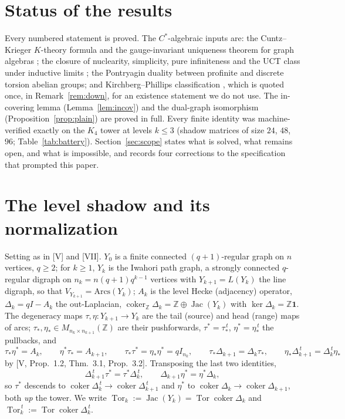 \documentclass[11pt]{amsart}
\numberwithin{equation}{section}
\theoremstyle{definition}
\theoremstyle{remark}
\newcommand{\Z}{\mathbb{Z}}
\newcommand{\Jac}{\operatorname{Jac}}
\newcommand{\coker}{\operatorname{coker}}
\newcommand{\Tor}{\operatorname{Tor}}
\newcommand{\ta}{\tau_*}
\newcommand{\taup}{\tau^*}
\newcommand{\et}{\eta_*}
\newcommand{\etp}{\eta^*}
\begin{document}
\maketitle

\section*{Status of the results}

Every numbered statement is proved. The $C^*$-algebraic inputs are: the
Cuntz--Krieger $K$-theory formula and the gauge-invariant uniqueness theorem for graph
algebras \cite{R}; the closure of nuclearity, simplicity, pure infiniteness and the UCT
class under inductive limits \cite{KR,Ro,RS}; the Pontryagin duality between profinite
and discrete torsion abelian groups; and Kirchberg--Phillips classification \cite{Ph},
which is quoted once, in Remark~\ref{rem:down}, for an existence statement we do not
use. The in-covering lemma (Lemma~\ref{lem:incov}) and the dual-graph isomorphism
(Proposition~\ref{prop:plain}) are proved in full. Every finite identity was
machine-verified exactly on the $K_4$ tower at levels $k\le3$ (shadow matrices of size
$24$, $48$, $96$; Table~\ref{tab:battery}). Section~\ref{sec:scope} states what is
solved, what remains open, and what is impossible, and records four corrections to the
specification that prompted this paper.

\section{The level shadow and its normalization}\label{sec:level}

Setting as in [V] and [VII]. $Y_0$ is a finite connected $(q{+}1)$-regular graph on $n$
vertices, $q\ge2$; for $k\ge1$, $Y_k$ is the Iwahori path graph, a strongly connected
$q$-regular digraph on $n_k=n(q{+}1)q^{k-1}$ vertices with $Y_{k+1}=L(Y_k)$ the line
digraph, so that $V_{Y_{k+1}}=\mathrm{Arcs}(Y_k)$; $A_k$ is the level Hecke (adjacency)
operator, $\Delta_k=qI-A_k$ the out-Laplacian, $\coker_\Z\Delta_k=\Z\oplus\Jac(Y_k)$
with $\ker\Delta_k=\Z\mathbf1$. The degeneracy maps $\tau,\eta\colon Y_{k+1}\to Y_k$
are the tail (source) and head (range) maps of arcs; $\ta,\et\in M_{n_k\times n_{k+1}}(\Z)$
are their pushforwards, $\taup=\ta^{\,t}$, $\etp=\et^{\,t}$ the pullbacks, and
\begin{equation}\label{eq:calculus}
\ta\etp=A_k,\qquad \etp\ta=A_{k+1},\qquad \ta\taup=\et\etp=qI_{n_k},\qquad
\ta\Delta_{k+1}=\Delta_k\ta,\qquad \et\Delta_{k+1}^{\,t}=\Delta_k^{\,t}\et
\end{equation}
by [V, Prop.~1.2, Thm.~3.1, Prop.~3.2]. Transposing the last two identities,
\begin{equation}\label{eq:pullbacks}
\Delta_{k+1}^{\,t}\taup=\taup\Delta_k^{\,t},\qquad \Delta_{k+1}\etp=\etp\Delta_k ,
\end{equation}
so $\taup$ descends to $\coker\Delta_k^{\,t}\to\coker\Delta_{k+1}^{\,t}$ and $\etp$ to
$\coker\Delta_k\to\coker\Delta_{k+1}$, both \emph{up} the tower. We write
$\Tor_k:=\Jac(Y_k)=\Tor\coker\Delta_k$ and $\Tor_k^{\,t}:=\Tor\coker\Delta_k^{\,t}$.
\end{document}

